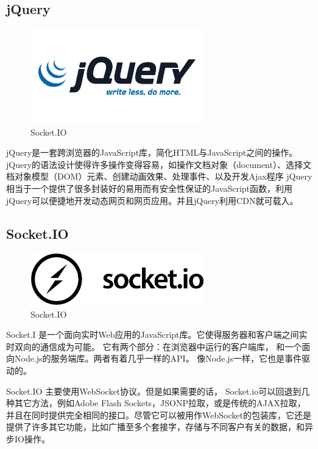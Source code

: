 \documentclass[11pt]{ctexart}
\begin{document}
\subsection{jQuery}
\begin{figure}[H]
    \begin{center}
    \includegraphics[width=0.67\textwidth]{figures/jquery.png}
    \caption{Socket.IO}
    \end{center}
\end{figure}
jQuery是一套跨浏览器的JavaScript库，简化HTML与JavaScript之间的操作。
jQuery的语法设计使得许多操作变得容易，如操作文档对象（document）、选择文档对象模型（DOM）元素、创建动画效果、处理事件、以及开发Ajax程序
jQuery相当于一个提供了很多封装好的易用而有安全性保证的JavaScript函数，利用jQuery可以便捷地开发动态网页和网页应用。并且jQuery利用CDN就可载入。
\subsection{Socket.IO}
\begin{figure}[H]
    \begin{center}
    \includegraphics[width=0.67\textwidth]{figures/socket.io.png}
    \caption{Socket.IO}
    \end{center}
\end{figure}
Socket.I 是一个面向实时Web应用的JavaScript库。它使得服务器和客户端之间实时双向的通信成为可能。
它有两个部分：在浏览器中运行的客户端库，
和一个面向Node.js的服务端库。两者有着几乎一样的API。
像Node.js一样，它也是事件驱动的。

Socket.IO 主要使用WebSocket协议。但是如果需要的话，
Socket.io可以回退到几种其它方法，例如Adobe Flash Sockets，JSONP拉取，或是传统的AJAX拉取，
并且在同时提供完全相同的接口。尽管它可以被用作WebSocket的包装库，它还是提供了许多其它功能，比如广播至多个套接字，存储与不同客户有关的数据，和异步IO操作。
\end{document}
